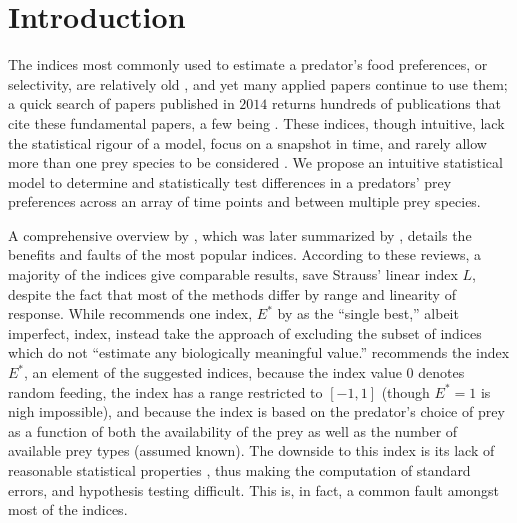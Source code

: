 \section{Introduction}
\label{sec:intro}

The indices most commonly used to estimate a predator's food preferences, or selectivity, are relatively old \citep{Ivlev:1964,Jacobs:1974,Chesson:1978,Strauss:1979,Vanderploeg:1979,Chesson:1983}, and yet many applied papers continue to use them; a quick search of papers published in $2014$ returns hundreds of publications that cite these fundamental papers, a few being \citet{Clements:2014,Hansen:2014,Hellstrom:2014,Lyngdoh:2014,Madduppa:2014}.  These indices, though intuitive, lack the statistical rigour of a model, focus on a snapshot in time, and rarely allow more than one prey species to be considered \citep{Lechowicz:1982}.  We propose an intuitive statistical model to determine and statistically test differences in a predators' prey preferences across an array of time points and between multiple prey species.   

A comprehensive overview by \citet{Lechowicz:1982}, which was later summarized by \citet{Manly:1992}, details the benefits and faults of the most popular indices.  According to these reviews, a majority of the indices give comparable results, save Strauss' linear index $L$, despite the fact that most of the methods differ by range and linearity of response.  While \citet{Lechowicz:1982} recommends one index, $E^*$ by \citet{Vanderploeg:1979} as the ``single best,'' albeit imperfect, index, \citet{Manly:1992} instead take the approach of excluding the subset of indices which do not ``estimate any biologically meaningful value.''  \citet{Lechowicz:1982} recommends the index $E^*$, an element of the \citet{Manly:1992} suggested indices, because the index value $0$ denotes random feeding, the index has a range restricted to $[-1,1]$ (though $E^*=1$ is nigh impossible), and because the index is based on the predator's choice of prey as a function of both the availability of the prey as well as the number of available prey types (assumed known).  The downside to this index is its lack of reasonable statistical properties \citep{Lechowicz:1982}, thus making the computation of standard errors, and hypothesis testing difficult.  This is, in fact, a common fault amongst most of the indices.  

